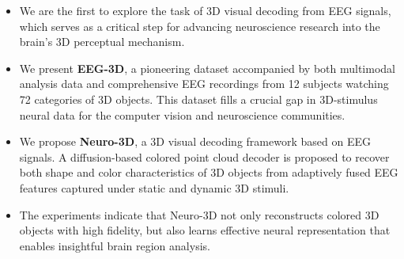 \begin{itemize}
	\item We are the first to explore the task of 3D visual decoding from EEG signals, which serves as a critical step for advancing neuroscience research into the brain’s 3D perceptual mechanism.
	\item We present \textbf{EEG-3D}, a pioneering dataset accompanied by both multimodal analysis data and comprehensive EEG recordings from 12 subjects watching 72 categories of 3D objects.
	This dataset fills a crucial gap in 3D-stimulus neural data for the computer vision and neuroscience communities.
	\item We propose \textbf{Neuro-3D}, a 3D visual decoding framework based on EEG signals. A diffusion-based colored point cloud decoder is proposed to recover both shape and color characteristics of 3D objects from adaptively fused EEG features captured under static and dynamic 3D stimuli. 
	\item The experiments indicate that Neuro-3D not only reconstructs colored 3D objects with high fidelity,  but also learns effective neural representation that enables insightful brain region analysis. 
\end{itemize}
